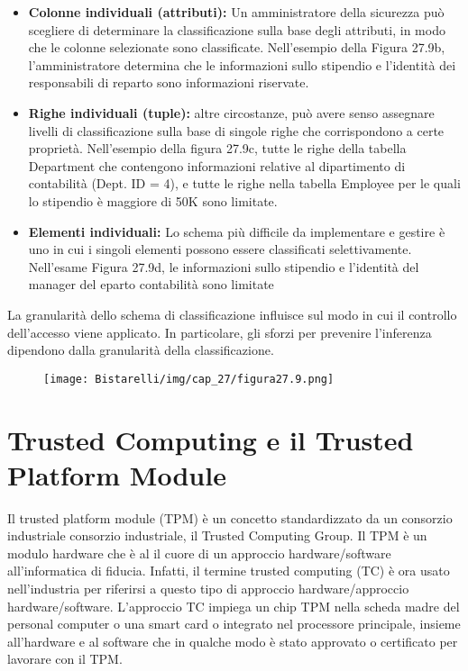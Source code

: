 \begin{itemize}
    \item \textbf{Colonne individuali (attributi):} Un amministratore della sicurezza può scegliere di determinare la classificazione sulla base degli attributi, in modo che le colonne selezionate sono classificate. Nell'esempio della Figura 27.9b, l'amministratore determina che le informazioni sullo stipendio e l'identità dei responsabili di reparto sono informazioni riservate.
    
    \item \textbf{Righe individuali (tuple):} altre circostanze, può avere senso assegnare livelli di classificazione sulla base di singole righe che corrispondono a certe proprietà. Nell'esempio della figura 27.9c, tutte le righe della tabella Department che contengono informazioni relative al dipartimento di contabilità (Dept. ID = 4), e tutte le righe nella tabella Employee per le quali lo stipendio è maggiore di 50K sono limitate.
    
    \item \textbf{Elementi individuali:} Lo schema più difficile da implementare e gestire è uno in cui i singoli elementi possono essere classificati selettivamente. Nell'esame Figura 27.9d, le informazioni sullo stipendio e l'identità del manager del eparto contabilità sono limitate
\end{itemize}
La granularità dello schema di classificazione influisce sul modo in cui il controllo dell'accesso viene applicato. In particolare, gli sforzi per prevenire l'inferenza dipendono dalla granularità della classificazione.

\begin{figure}[H]
	\centering
    \texttt{[image: Bistarelli/img/cap\_27/figura27.9.png]}
\end{figure}


\section{Trusted Computing e il Trusted Platform Module}

Il trusted platform module (TPM) è un concetto standardizzato da un consorzio industriale consorzio industriale, il Trusted Computing Group. Il TPM è un modulo hardware che è al il cuore di un approccio hardware/software all'informatica di fiducia. Infatti, il termine trusted computing (TC) è ora usato nell'industria per riferirsi a questo tipo di approccio hardware/approccio hardware/software. L'approccio TC impiega un chip TPM nella scheda madre del personal computer o una smart card o integrato nel processore principale, insieme all'hardware e al software che in qualche modo è stato approvato o certificato per lavorare con il TPM.

